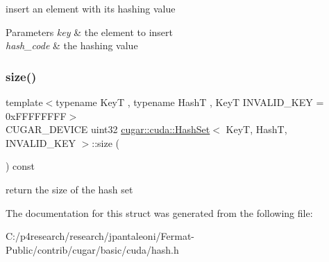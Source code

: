 insert an element with its hashing value


\begin{DoxyParams}{Parameters}
{\em key} & the element to insert \\
\hline
{\em hash\+\_\+code} & the hashing value \\
\hline
\end{DoxyParams}
\mbox{\label{structcugar_1_1cuda_1_1_hash_set_a624a256797d939b735e4aee67c352693}} 
\subsubsection{\texorpdfstring{size()}{size()}}
{\footnotesize\ttfamily template$<$typename KeyT , typename HashT , KeyT I\+N\+V\+A\+L\+I\+D\+\_\+\+K\+EY = 0x\+F\+F\+F\+F\+F\+F\+FF$>$ \\
C\+U\+G\+A\+R\+\_\+\+D\+E\+V\+I\+CE uint32 \hyperlink{structcugar_1_1cuda_1_1_hash_set}{cugar\+::cuda\+::\+Hash\+Set}$<$ KeyT, HashT, I\+N\+V\+A\+L\+I\+D\+\_\+\+K\+EY $>$\+::size (\begin{DoxyParamCaption}{ }\end{DoxyParamCaption}) const\hspace{0.3cm}{\ttfamily [inline]}}

return the size of the hash set 

The documentation for this struct was generated from the following file\+:\begin{DoxyCompactItemize}
\item 
C\+:/p4research/research/jpantaleoni/\+Fermat-\/\+Public/contrib/cugar/basic/cuda/hash.\+h\end{DoxyCompactItemize}
